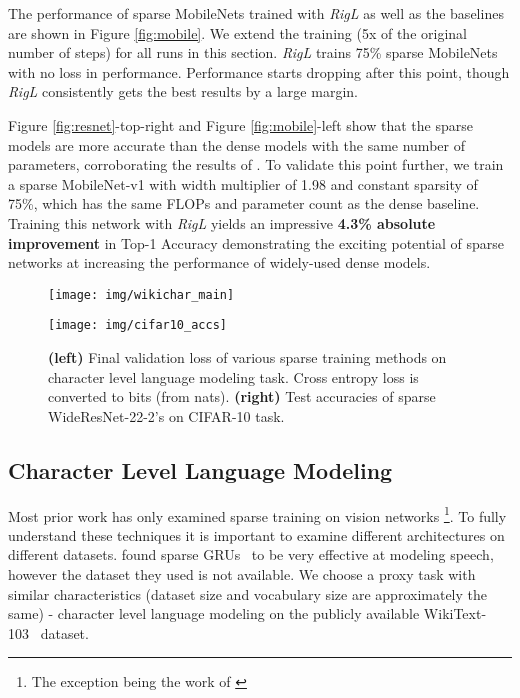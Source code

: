 \documentclass{article}
\begin{document}
The performance of sparse MobileNets trained with {\em RigL} as well as the baselines are shown in Figure \ref{fig:mobile}. We extend the training (5x of the original number of steps) for all runs in this section. \textit{RigL} trains 75\% sparse MobileNets with no loss in performance. Performance starts dropping after this point, though {\em RigL} consistently gets the best results by a large margin.

Figure \ref{fig:resnet}-top-right and Figure \ref{fig:mobile}-left show that the sparse models are more accurate than the dense models with the same number of parameters, corroborating the results of \citet{kalchbrenner2018}. To validate this point further, we train a sparse MobileNet-v1 with width multiplier of 1.98 and constant sparsity of 75\%, which has the same FLOPs and parameter count as the dense baseline. Training this network with {\em RigL} yields an impressive \textbf{4.3\% absolute improvement} in Top-1 Accuracy demonstrating the exciting potential of sparse networks at increasing the performance of widely-used dense models.
\begin{figure*}[!t]
\centering
\begin{minipage}{.5\textwidth}
  \centering
  \texttt{[image: img/wikichar\_main]}
\end{minipage}\begin{minipage}{.5\textwidth}
  \centering
  \texttt{[image: img/cifar10\_accs]}
\end{minipage}
\caption{\textbf{(left)} Final validation loss of various sparse training methods on character level language modeling task. Cross entropy loss is converted to bits (from nats). \textbf{(right)} Test accuracies of sparse WideResNet-22-2's on CIFAR-10 task.}
\label{fig:wikichar_cifar10}
\end{figure*}

\subsection{Character Level Language Modeling}
\label{sec:chargru}

Most prior work has only examined sparse training on vision networks \footnote{The exception being the work of \citet{Bellec2017}}.  To fully understand these techniques it is important to examine different architectures on different datasets.  \citet{kalchbrenner2018} found sparse GRUs~\citep{GRU} to be very effective at modeling speech, however the dataset they used is not available.  We choose a proxy task with similar characteristics (dataset size and vocabulary size are approximately the same) - character level language modeling on the publicly available WikiText-103~\citep{wikitext103} dataset.
\end{document}
